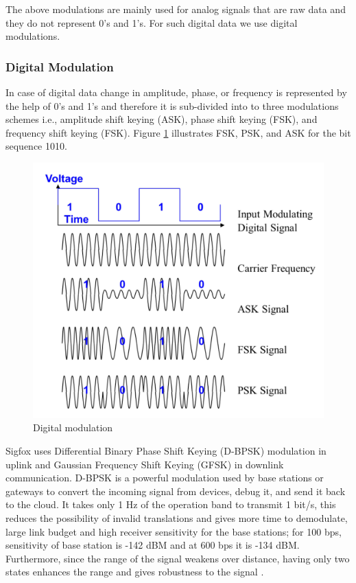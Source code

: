 \documentclass[12pt]{article}
\begin{document}
    The above modulations are mainly used for analog signals that are raw data and they do not represent 0's and 1's. For such digital data we use digital modulations.
    \subsubsection{ Digital Modulation} In case of digital data change in amplitude, phase, or frequency is represented by the help of 0's and 1's and therefore it is sub-divided into to three modulations schemes i.e., amplitude shift keying (ASK), phase shift keying (FSK), and frequency shift keying (FSK). Figure \ref{fig:Digital Modulation} illustrates FSK, PSK, and ASK for the bit sequence 1010.
   
   \begin{figure}[H]
       \centering
       \includegraphics[width=0.5 \columnwidth]{Images/digitalModulation.pdf}
       \caption{Digital modulation}
       \label{fig:Digital Modulation}
   \end{figure}
 
  Sigfox uses Differential Binary Phase Shift Keying (D-BPSK) modulation in uplink and Gaussian Frequency Shift Keying (GFSK) in downlink communication. D-BPSK is a powerful modulation used by base stations or gateways to convert the incoming signal from devices, debug it, and send it back to the cloud. It takes only 1 Hz of the operation band to transmit 1 bit/s, this reduces the possibility of invalid translations and gives more time to demodulate, large link budget and high receiver sensitivity for the base stations; for 100 bps, sensitivity of base station is -142 dBM and at 600 bps it is -134 dBM. Furthermore, since the range of the signal weakens over distance, having only two states enhances the range and gives robustness to the signal \cite{gaddam2018comparative}.
 
\end{document}
